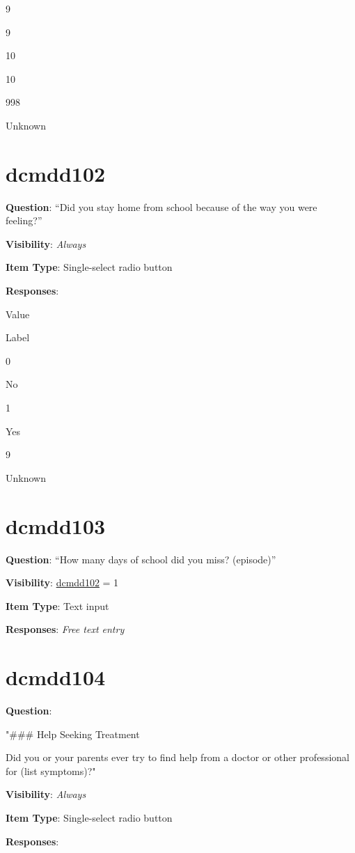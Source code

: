 \documentclass[
]{book}
\begin{document}
9

9

10

10

998

Unknown

\hypertarget{dcmdd102}{%
\section{dcmdd102}\label{dcmdd102}}

\textbf{Question}: ``Did you stay home from school because of the way you were feeling?''

\textbf{Visibility}: \emph{Always}

\textbf{Item Type}: Single-select radio button

\textbf{Responses}:

Value

Label

0

No

1

Yes

9

Unknown

\hypertarget{dcmdd103}{%
\section{dcmdd103}\label{dcmdd103}}

\textbf{Question}: ``How many days of school did you miss? (episode)''

\textbf{Visibility}: \protect\hyperlink{dcmdd102}{dcmdd102} = 1

\textbf{Item Type}: Text input

\textbf{Responses}: \emph{Free text entry}

\hypertarget{dcmdd104}{%
\section{dcmdd104}\label{dcmdd104}}

\textbf{Question}:

"\#\#\# Help Seeking Treatment

Did you or your parents ever try to find help from a doctor or other professional for (list symptoms)?"

\textbf{Visibility}: \emph{Always}

\textbf{Item Type}: Single-select radio button

\textbf{Responses}:
\end{document}
